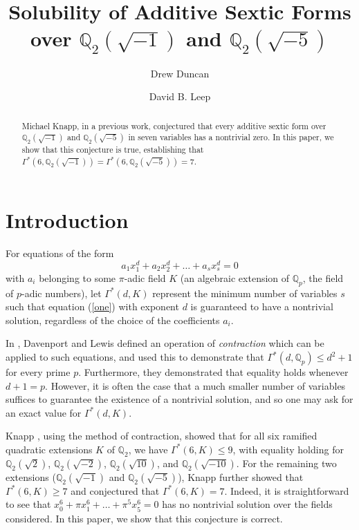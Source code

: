 \documentclass[draft]{publmathdeb}
\title{Solubility of Additive Sextic Forms over $\mathbb{Q}_2(\sqrt{-1})$ and $\mathbb{Q}_2(\sqrt{-5})$}
\author{Drew Duncan}
\author{David B. Leep}
\begin{document}
\begin{abstract}


Michael Knapp, in a previous work, conjectured that every additive sextic form over $\mathbb{Q}_2(\sqrt{-1})$ and $\mathbb{Q}_2(\sqrt{-5})$ in seven variables has a nontrivial zero. In this paper, we show that this conjecture is true, establishing that $\Gamma^*(6, \mathbb{Q}_2(\sqrt{-1})) = \Gamma^*(6, \mathbb{Q}_2(\sqrt{-5})) = 7 $.
\end{abstract}

\maketitle

\section{Introduction}
For equations of the form
\begin{equation}
\label{one}
a_1x_1^d + a_2x_2^d + \ldots + a_sx_s^d = 0
\end{equation}
with $a_i$ belonging to some $\pi$-adic field $K$ (an algebraic extension of $\mathbb{Q}_p$, the field of $p$-adic numbers), let $\Gamma^*(d, K)$ represent the minimum number of variables $s$ such that equation (\ref{one}) with exponent $d$ is guaranteed to have a nontrivial solution, regardless of the choice of the coefficients $a_i$.

In \cite{davenport1963homogeneous}, Davenport and Lewis defined an operation of \textit{contraction} which can be applied to such equations, and used this to demonstrate that $\Gamma^*(d, \mathbb{Q}_p) \le d^2+1$ for every prime $p$.  Furthermore, they demonstrated that equality holds whenever $d+1 = p$.  However, it is often the case that a much smaller number of variables suffices to guarantee the existence of a nontrivial solution, and so one may ask for an exact value for $\Gamma^*(d, K).$

Knapp \cite{knapp2016solubility}, using the method of contraction, showed that for all six ramified quadratic extensions $K$ of $\mathbb{Q}_2$, we have $\Gamma^*(6,K) \le 9$, with equality holding for $\mathbb{Q}_2(\sqrt{2})$, $\mathbb{Q}_2(\sqrt{-2})$, $\mathbb{Q}_2(\sqrt{10})$, and $\mathbb{Q}_2(\sqrt{-10})$.  For the remaining two extensions ($\mathbb{Q}_2(\sqrt{-1})$ and $\mathbb{Q}_2(\sqrt{-5})$), Knapp further showed that $\Gamma^*(6,K) \ge 7$ and conjectured that $\Gamma^*(6,K) = 7$.  Indeed, it is straightforward to see that $x_0^6 + \pi x_1^6 + \ldots + \pi^5 x_5^6 = 0$ has no nontrivial solution over the fields considered.  In this paper, we show that this conjecture is correct.
\end{document}
